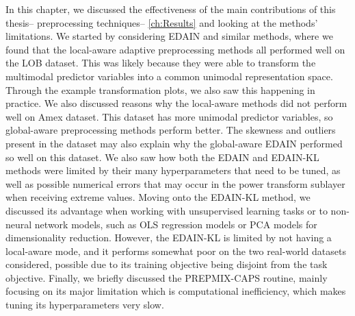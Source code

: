 \documentclass{statsmsc}
\begin{document}
{In this chapter, we discussed the effectiveness of the main contributions of
this thesis--%
preprocessing techniques--%
\cref{ch:Results} and looking at the methods' limitations.  We started by
considering \ac{EDAIN} and similar methods, where we found that the local-aware
adaptive preprocessing methods all performed well on the \ac{LOB} dataset. This
was likely because they were able to transform the multimodal predictor
variables into a common unimodal representation space. Through the example
transformation plots, we also saw this happening in practice.  We also
discussed reasons why the local-aware methods did not perform well on Amex
dataset. This dataset has more unimodal predictor variables, so global-aware
preprocessing methods perform better.  The skewness and outliers present in the
dataset may also explain why the global-aware \ac{EDAIN} performed so well on
this dataset.  We also saw how both the \ac{EDAIN} and \ac{EDAIN-KL} methods
were limited by their many hyperparameters that need to be tuned, as well as
possible numerical errors that may occur in the power transform sublayer when
receiving extreme values.  Moving onto the \ac{EDAIN-KL} method, we discussed
its advantage when working with unsupervised learning tasks or to non-neural
network models, such as \ac{OLS} regression models or \ac{PCA} models for
dimensionality reduction. However, the \ac{EDAIN-KL} is limited by not having a
local-aware mode, and it performs somewhat poor on the two real-world datasets
considered, possible due to its training objective being disjoint from the task
objective.  Finally, we briefly discussed the \ac{PREPMIX-CAPS} routine, mainly
focusing on its major limitation which is computational inefficiency, which
makes tuning its hyperparameters very slow.





}
\end{document}
